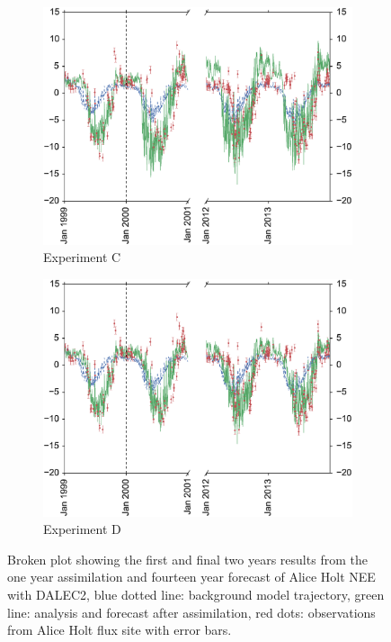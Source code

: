\documentclass[11pt]{article}
\begin{document}
\begin{figure}
\begin{subfigure}[b]{0.49\textwidth}
        \includegraphics[width=\textwidth]{Cbroke4dvar.eps}
        \caption{Experiment C}
        \label{fig:broke4dvarBcorR}
    \end{subfigure}
    \begin{subfigure}[b]{0.49\textwidth}
        \includegraphics[width=\textwidth]{Dbroke4dvar.eps}
        \caption{Experiment D}
        \label{fig:broke4dvaredcBcorR}
    \end{subfigure}
    \caption{Broken plot showing the first and final two years results from the one year assimilation and fourteen year forecast of Alice Holt NEE with DALEC2, blue dotted line: background model trajectory, green line: analysis and forecast after assimilation, red dots: observations from Alice Holt flux site with error bars.}\label{fig:4dvar}
\end{figure}
\end{document}
